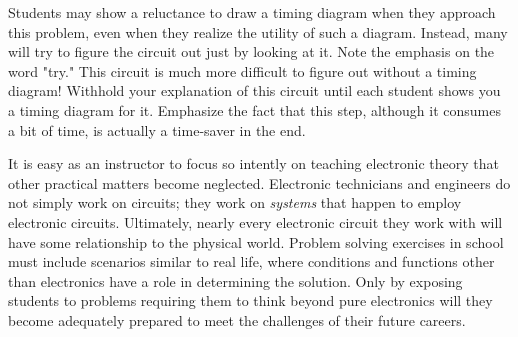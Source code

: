 Students may show a reluctance to draw a timing diagram when they approach this problem, even when they realize the utility of such a diagram.  Instead, many will try to figure the circuit out just by looking at it.  Note the emphasis on the word "try."  This circuit is much more difficult to figure out without a timing diagram!  Withhold your explanation of this circuit until each student shows you a timing diagram for it.  Emphasize the fact that this step, although it consumes a bit of time, is actually a time-saver in the end.

It is easy as an instructor to focus so intently on teaching electronic theory that other practical matters become neglected.  Electronic technicians and engineers do not simply work on circuits; they work on {\it systems} that happen to employ electronic circuits.  Ultimately, nearly every electronic circuit they work with will have some relationship to the physical world.  Problem solving exercises in school must include scenarios similar to real life, where conditions and functions other than electronics have a role in determining the solution.  Only by exposing students to problems requiring them to think beyond pure electronics will they become adequately prepared to meet the challenges of their future careers.




